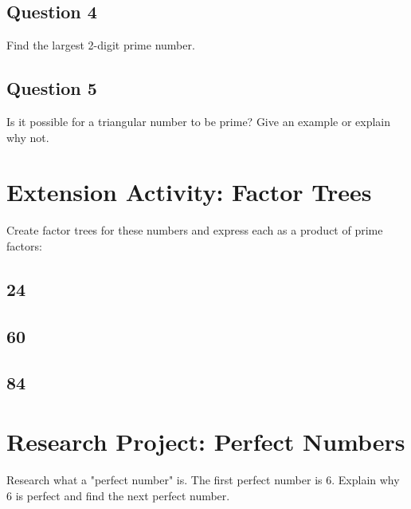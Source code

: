 \documentclass{article}
\begin{document}
\vspace{3cm}

\subsection*{Question 4}
Find the largest 2-digit prime number.

\vspace{2cm}

\subsection*{Question 5}
Is it possible for a triangular number to be prime? Give an example or explain why not.

\vspace{2cm}

\section{Extension Activity: Factor Trees}
Create factor trees for these numbers and express each as a product of prime factors:

\subsection*{24}
\vspace{3cm}

\subsection*{60}
\vspace{3cm}

\subsection*{84}
\vspace{3cm}

\section*{Research Project: Perfect Numbers}
Research what a "perfect number" is. The first perfect number is 6. Explain why 6 is perfect and find the next perfect number.

\vspace{3cm}
\end{document}
